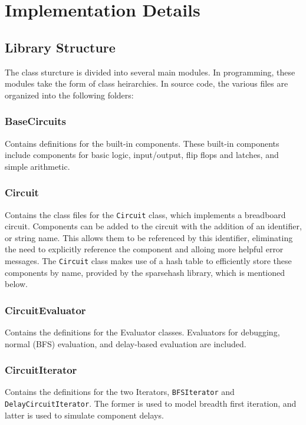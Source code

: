 \documentclass{article}
\newcommand{\ClassName}[1]{\texttt{#1}}
\begin{document}
\section{Implementation Details}

\subsection{Library Structure}

The class sturcture is divided into several main modules. In programming, these modules take the form of class heirarchies. In source code, the various files are organized into the following folders:

\subsubsection{BaseCircuits}

Contains definitions for the built-in components. These built-in components include components for basic logic, input/output, flip flops and latches, and simple arithmetic.

\subsubsection{Circuit}

Contains the class files for the \ClassName{Circuit} class, which implements a breadboard circuit. Components can be added to the circuit with the addition of an identifier, or string name. This allows them to be referenced by this identifier, eliminating the need to explicitly reference the component and alloing more helpful error messages. The \ClassName{Circuit} class makes use of a hash table to efficiently store these components by name, provided by the sparsehash library, which is mentioned below.

\subsubsection{CircuitEvaluator}

Contains the definitions for the Evaluator classes. Evaluators for debugging, normal (BFS) evaluation, and delay-based evaluation are included.

\subsubsection{CircuitIterator}

Contains the definitions for the two Iterators, \ClassName{BFSIterator} and \ClassName{DelayCircuitIterator}. The former is used to model breadth first iteration, and latter is used to simulate component delays.
\end{document}
